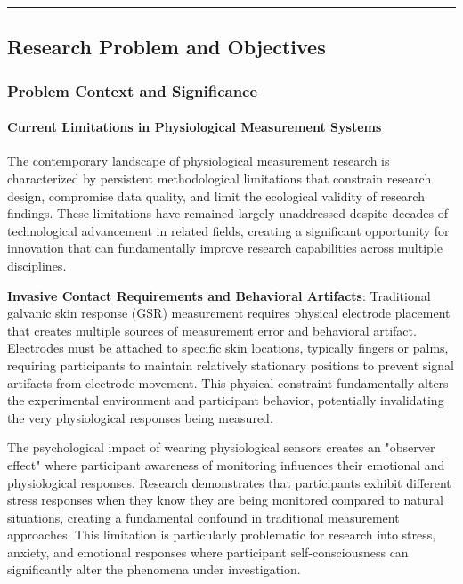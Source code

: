 \documentclass[12pt,a4paper]{report}
\begin{document}
\hrule

\subsection{Research Problem and Objectives}

\subsubsection{Problem Context and Significance}

\paragraph{Current Limitations in Physiological Measurement Systems}

The contemporary landscape of physiological measurement research is characterized by persistent methodological
limitations that constrain research design, compromise data quality, and limit the ecological validity of research
findings. These limitations have remained largely unaddressed despite decades of technological advancement in related
fields, creating a significant opportunity for innovation that can fundamentally improve research capabilities across
multiple disciplines.

\textbf{Invasive Contact Requirements and Behavioral Artifacts}: Traditional galvanic skin response (GSR) measurement
requires physical electrode placement that creates multiple sources of measurement error and behavioral artifact.
Electrodes must be attached to specific skin locations, typically fingers or palms, requiring participants to maintain
relatively stationary positions to prevent signal artifacts from electrode movement. This physical constraint
fundamentally alters the experimental environment and participant behavior, potentially invalidating the very
physiological responses being measured.

The psychological impact of wearing physiological sensors creates an "observer effect" where participant awareness of
monitoring influences their emotional and physiological responses. Research demonstrates that participants exhibit
different stress responses when they know they are being monitored compared to natural situations, creating a
fundamental confound in traditional measurement approaches. This limitation is particularly problematic for research
into stress, anxiety, and emotional responses where participant self-consciousness can significantly alter the phenomena
under investigation.
\end{document}
